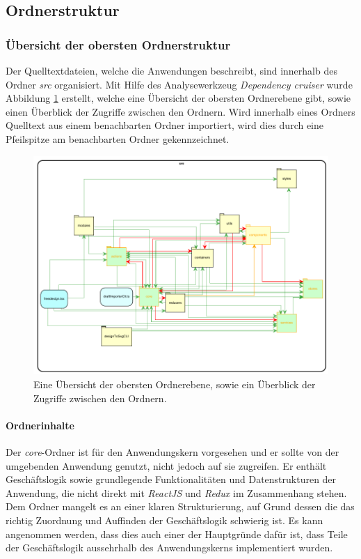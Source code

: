 \subsection{Ordnerstruktur}

\subsubsection{Übersicht der obersten Ordnerstruktur}
Der Quelltextdateien, welche die Anwendungen beschreibt, sind innerhalb des Ordner \textit{src} organisiert. 
Mit Hilfe des Analysewerkzeug \textit{Dependency cruiser} wurde Abbildung \ref{fig:obersteOrdnerebene}  erstellt, welche eine Übersicht der obersten Ordnerebene gibt, sowie einen Überblick der Zugriffe zwischen den Ordnern. Wird innerhalb eines Ordners Quelltext aus einem benachbarten Ordner importiert, wird dies durch eine Pfeilspitze am benachbarten Ordner gekennzeichnet. 

\begin{figure}[H]
	\centering
	\includegraphics{diagrams/Ist-Architektur/high-level-graph.pdf}
	\caption{Eine Übersicht der obersten Ordnerebene, sowie ein Überblick der Zugriffe zwischen den Ordnern.}
	\label{fig:obersteOrdnerebene}
\end{figure}

\paragraph{Ordnerinhalte}
Der \textit{core}-Ordner ist für den Anwendungskern vorgesehen und er sollte von der umgebenden Anwendung genutzt, nicht jedoch auf sie zugreifen. Er enthält Geschäftslogik sowie grundlegende Funktionalitäten und Datenstrukturen der Anwendung, die nicht direkt mit \textit{ReactJS} und \textit{Redux} im Zusammenhang stehen. Dem Ordner mangelt es an einer klaren Strukturierung, auf Grund dessen die das richtig Zuordnung und Auffinden der Geschäftslogik schwierig ist. Es kann angenommen werden, dass dies auch einer der Hauptgründe dafür ist, dass Teile der Geschäftslogik aussehrhalb des Anwendungskerns implementiert wurden. 

